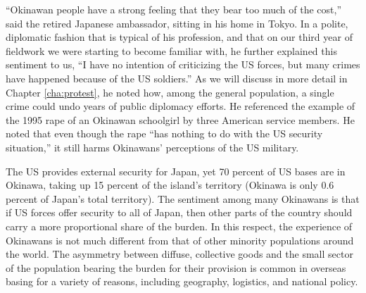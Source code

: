 ``Okinawan people have a strong feeling that they bear too much of the cost,'' said the retired Japanese ambassador, sitting in his home in Tokyo.\cite{tokyoone20200427} In a polite, diplomatic fashion that is typical of his profession, and that on our third year of fieldwork we were starting to become familiar with, he further explained this sentiment to us, ``I have no intention of criticizing the US forces, but many crimes have happened because of the US soldiers.'' As we will discuss in more detail in Chapter \ref{cha:protest}, he noted how, among the general population, a single crime could undo years of public diplomacy efforts. He referenced the example of the 1995 rape of an Okinawan schoolgirl by three American service members. He noted that even though the rape ``has nothing to do with the US security situation,''  it still harms Okinawans' perceptions of the US military. 

The US provides external security for Japan, yet 70 percent of US bases are in Okinawa, taking up 15 percent of the island's territory (Okinawa is only 0.6 percent of Japan's total territory).\cite{JPTimes2020,tokyoone20200427} The sentiment among many Okinawans is that if US forces offer security to all of Japan, then other parts of the country should carry a more proportional share of the burden. In this respect, the experience of Okinawans is not much different from that of other minority populations around the world. The asymmetry between diffuse, collective goods and the small sector of the population bearing the burden for their provision is common in overseas basing for a variety of reasons, including geography, logistics, and national policy.

